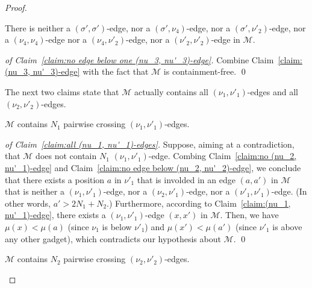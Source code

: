\documentclass[a4paper]{llncs}
\begin{document}
\begin{proof}
  \begin{claim}
    \label{claim:no edge below one (nu_3, nu'_3)-edge}
    There is
    neither a $(\sigma', \sigma')$-edge,
    nor a $(\sigma', \nu_4)$-edge,
    nor a $(\sigma', \nu'_2)$-edge,
    nor a $(\nu_4, \nu_4)$-edge
    nor a $(\nu_4, \nu'_2)$-edge,
    nor a $(\nu'_2, \nu'_2)$-edge
    in $\mathcal{M}$.
  \end{claim}

  \begin{proof}[of Claim~\ref{claim:no edge below one (nu_3, nu'_3)-edge}]
    Combine Claim~\ref{claim:(nu_3, nu'_3)-edge} with the fact that
    $\mathcal{M}$ is containment-free.
    \qed
  \end{proof}

  The next two claims state that $\mathcal{M}$ actually contains
  all $(\nu_1, \nu'_1)$-edges and all $(\nu_2, \nu'_2)$-edges.

  \begin{claim}
    \label{claim:all (nu_1, nu'_1)-edges}
    $\mathcal{M}$ contains $N_1$ pairwise crossing $(\nu_1, \nu'_1)$-edges.
  \end{claim}

  \begin{proof}[of Claim~\ref{claim:all (nu_1, nu'_1)-edges}]
    Suppose, aiming at a contradiction, that
    $\mathcal{M}$ does not contain $N_1$ $(\nu_1, \nu'_1)$-edge.
    Combing Claim~\ref{claim:no (nu_2, nu'_1)-edge} and
    Claim~\ref{claim:no edge below (nu_2, nu'_2)-edge},
    we conclude that there exists a position $a$ in $\nu'_1$ that is
    involded in an edge $(a, a')$ in $\mathcal{M}$ that is
    neither a $(\nu_1, \nu'_1)$-edge,
    nor a $(\nu_2, \nu'_1)$-edge,
    nor a $(\nu'_1, \nu'_1)$-edge.
    (In other words, $a' > 2N_1 + N_2$.)
    Furthermore, according to Claim~\ref{claim:(nu_1, nu'_1)-edge},
    there exists a $(\nu_1, \nu'_1)$-edge $(x, x')$ in $\mathcal{M}$.
    Then, we have
    $\mu(x) < \mu(a)$ (since $\nu_1$ is below $\nu'_1$) and
    $\mu(x') < \mu(a')$ (since $\nu'_1$ is above any other gadget),
    which contradicts our hypothesis about $\mathcal{M}$.
    \qed
  \end{proof}

  \begin{claim}
    \label{claim:all (nu_2, nu'_2)-edges}
    $\mathcal{M}$ contains $N_2$ pairwise crossing $(\nu_2, \nu'_2)$-edges.
  \end{claim}


\end{proof}
\end{document}
